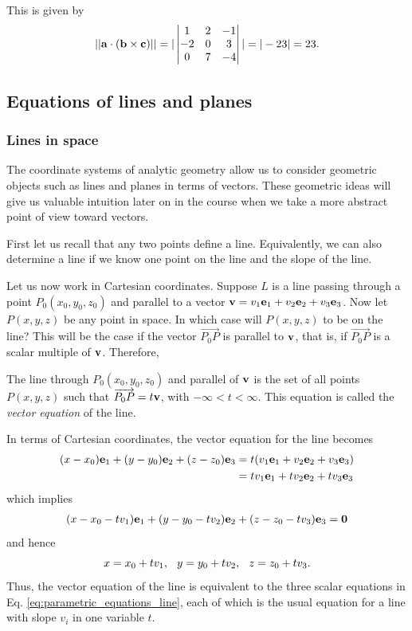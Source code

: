 \documentclass[12pt,letterpaper,reqno]{article}
\numberwithin{equation}{section}
\newcommand{\ti}[1]{\textit{#1}}
\begin{document}
{\color{red} 
This is given by
\begin{align*}
	||{\bf a} \cdot ({\bf b} \times {\bf c})||=\vert \begin{vmatrix}
		1 & 2 & -1 \\ -2 & 0 & 3 \\ 0 & 7 & -4
	\end{vmatrix} \vert = \vert -23 \vert = 23.
\end{align*}}

\subsection{Equations of lines and planes}
\subsubsection{Lines in space}
The coordinate systems of analytic geometry allow us to consider geometric objects such as lines and planes in terms of vectors. These geometric ideas will give us valuable intuition later on in the course when we take a more abstract point of view toward vectors.

First let us recall that any two points define a line. Equivalently, we can also determine a line if we know one point on the line and the slope of the line. 

Let us now work in Cartesian coordinates. Suppose $L$ is a line passing through a point $P_0(x_0,y_0,z_0)$ and parallel to a vector ${\bf v}=v_1{\bf e}_1+v_2{\bf e}_2+v_3{\bf e}_3$. Now let $P(x,y,z)$ be any point in space. In which case will $P(x,y,z)$ to be on the line? This will be the case if the vector $\overrightarrow{P_0P}$ is parallel to ${\bf v}$, that is, if $\overrightarrow{P_0P}$ is a scalar multiple of ${\bf v}$. Therefore,
\begin{defn}
	The line through $P_0(x_0,y_0,z_0)$ and parallel of ${\bf v}$ is the set of all points $P(x,y,z)$ such that $\overrightarrow{P_0P}=t{\bf v}$, with $-\infty < t < \infty$. This equation is called the \ti{vector equation} of the line.
\end{defn}
In terms of Cartesian coordinates, the vector equation for the line becomes
\begin{align*}
	(x-x_0){\bf e}_1+(y-y_0){\bf e}_2+(z-z_0){\bf e}_3&=t(v_1{\bf e}_1+v_2{\bf e}_2+v_3{\bf e}_3) \\
	&=tv_1{\bf e}_1+tv_2{\bf e}_2+tv_3{\bf e}_3
\end{align*}
which implies
\begin{align*}
	(x-x_0-tv_1){\bf e}_1+(y-y_0-tv_2){\bf e}_2+(z-z_0-tv_3){\bf e}_3={\bf 0}
\end{align*}
and hence
\begin{equation}\label{eq:parametric_equations_line}
	x=x_0+tv_1, \hspace{0.25cm} y=y_0+tv_2, \hspace{0.25cm} z=z_0+tv_3.
\end{equation}
Thus, the vector equation of the line is equivalent to the three scalar equations in Eq. \eqref{eq:parametric_equations_line}, each of which is the usual equation for a line with slope $v_i$ in one variable $t$.
\end{document}
